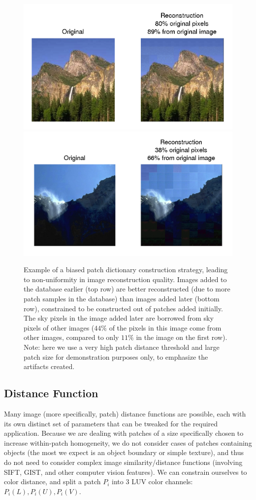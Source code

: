  \begin{figure}
\centering
\includegraphics[width=0.7\linewidth]{Figures/009.png}
\includegraphics[width=0.7\linewidth]{Figures/014.png}
\caption{Example of a biased patch dictionary construction strategy, leading to non-uniformity in image reconstruction quality. Images added to the database earlier (top row) are better reconstructed (due to more patch samples in the database) than images added later (bottom row), constrained to be constructed out of patches added initially. The sky pixels in the image added later are borrowed from sky pixels of other images ($44\%$ of the pixels in this image come from other images, compared to only $11\%$ in the image on the first row). Note: here we use a very high patch distance threshold and large patch size for demonstration purposes only, to emphasize the artifacts created.}
\label{fig:sampStrategy}
\end{figure}


\subsection{Distance Function}
\label{sec:simthresh}

Many image (more specifically, patch) distance functions are possible, each with its own distinct set of parameters that can be tweaked for the required application. Because we are dealing with patches of a size specifically chosen to increase within-patch homogeneity, we do not consider cases of patches containing objects (the most we expect is an object boundary or simple texture), and thus do not need to consider complex image similarity/distance functions (involving SIFT, GIST, and other computer vision features). We can constrain ourselves to color distance, and split a patch $P_i$ into 3 LUV color channels: $P_i(L), P_i(U), P_i(V)$.

